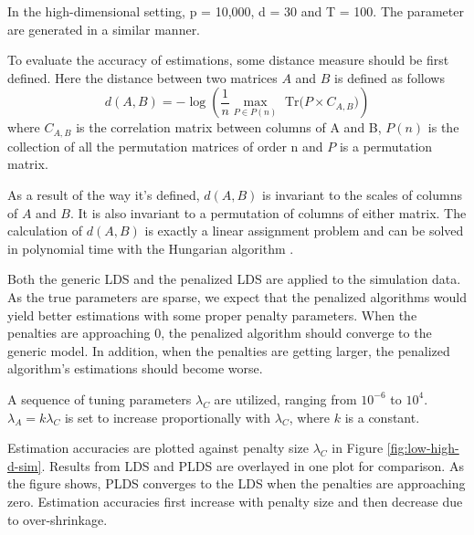 \documentclass[fleqn]{article}
\let\oldref\ref
\renewcommand{\ref}[1]{(\oldref{#1})}
\begin{document}
In the high-dimensional setting, p = 10,000, d = 30 and T = 100. The parameter are generated in a similar manner.

To evaluate the accuracy of estimations, some distance measure should be first defined. Here the distance between two matrices $A$ and $B$ is defined as follows
\begin{equation*}
d( A,B) = -\log(\frac{1}{n}\max_{P\in P(n)} \text{ Tr}\bigl(P\times C_{A,B}\bigr))
\end{equation*}
where $C_{A,B}$ is the correlation matrix between columns of A and B, $P(n)$ is the collection of all the permutation matrices of order n and $P$ is a permutation matrix.

As a result of the way it's defined, $d(A,B)$ is invariant to the scales of columns of $A$ and $B$. It is also invariant to a permutation of columns of either matrix. The calculation of $d(A,B)$ is exactly a linear assignment problem and can be solved in polynomial time with the Hungarian algorithm \cite{kuhn1955hungarian}.


Both the generic LDS and the penalized LDS are applied to the simulation data. As the true parameters are sparse, we expect that the penalized algorithms would yield better estimations with some proper penalty parameters. When the penalties are approaching 0, the penalized algorithm should converge to the generic model. In addition, when the penalties are getting larger, the penalized algorithm's estimations should become worse.

A sequence of tuning parameters $\lambda_C$ are utilized, ranging from $10^{-6}$ to $10^4$. $\lambda_A = k \lambda_C$ is set to increase proportionally with $\lambda_C$, where $k$ is a constant.

Estimation accuracies are plotted against penalty size $\lambda_C$ in Figure \oldref{fig:low-high-d-sim}. Results from LDS and PLDS are overlayed in one plot for comparison. As the figure shows, PLDS converges to the LDS when the penalties are approaching zero. Estimation accuracies first increase with penalty size and then decrease due to over-shrinkage.
\end{document}
